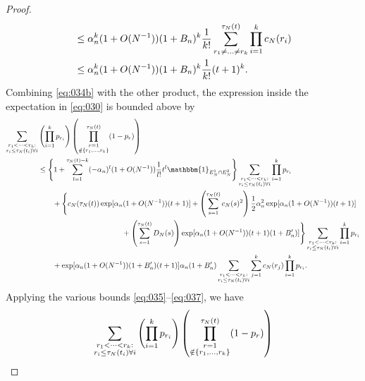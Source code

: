 \documentclass{article}
\newcommand{\1}[1]{\mathbbm{1}_{#1}}
\begin{document}
\begin{proof}
\begin{align}
&\leq \alpha_n^k (1+O(N^{-1})) (1 + B_n)^k \frac{1}{k!}
        \sum_{r_1 \neq \dots\neq r_k}^{\tau_N(t)} 
        \prod_{i=1}^k c_N(r_i) \notag\\
&\leq \alpha_n^k (1+O(N^{-1})) (1 + B_n)^k \frac{1}{k!} (t+1)^k. 
        \label{eq:037}
\end{align}
Combining \eqref{eq:034b} with the other product, the expression inside the expectation in \eqref{eq:030} is bounded above by
\begin{align}
\sum_{\substack{r_1 <\dots< r_k :\\ r_i \leq \tau_N(t_i) \forall i}}
        &\left( \prod_{i=1}^k p_{r_i} \right)
        \left( \prod_{\substack{r=1 \\ \notin \{r_1,\dots,r_k\} }}^{\tau_N(t)} 
        (1-p_r) \right) \notag\\
&\leq \Bigg\{ 1+ \sum_{l=1}^{\tau_N(t) -k} (-\alpha_n)^l (1+O(N^{-1})) 
        \frac{1}{l!} t^l \1{E_N^1 \cap E_N^2} \Bigg\}
        \sum_{\substack{r_1 <\dots< r_k :\\ r_i \leq \tau_N(t_i) \forall i}}
        \prod_{i=1}^k p_{r_i} \notag\\
    &\qquad+ \Bigg\{ c_N(\tau_N(t)) 
        \exp[ \alpha_n (1+O(N^{-1})) (t+1) ]
        + \left( \sum_{s=1}^{\tau_N(t)} c_N(s)^2 \right)
        \frac{1}{2} \alpha_n^2 \exp[ \alpha_n (1+O(N^{-1})) (t+1) ] \notag\\
    &\hspace{4cm}+ \left( \sum_{s=1}^{\tau_N(t)} D_N(s) \right)
        \exp[ \alpha_n (1+O(N^{-1})) (t+1) (1+B_n^\prime) ] \Bigg\}
        \sum_{\substack{r_1 <\dots< r_k :\\ r_i \leq \tau_N(t_i) \forall i}}
        \prod_{i=1}^k p_{r_i} \notag\\
    &\qquad+ \exp[ \alpha_n (1+O(N^{-1})) (1 + B_n^\prime) (t+1) ]
        \alpha_n (1 + B_n^\prime)
        \sum_{\substack{r_1 <\dots< r_k :\\ r_i \leq \tau_N(t_i) \forall i}}
        \sum_{j=1}^k c_N(r_j)
        \prod_{i=1}^k p_{r_i} .
\end{align}
Applying the various bounds \eqref{eq:035}--\eqref{eq:037}, we have
\begin{align}
\sum_{\substack{r_1 <\dots< r_k :\\ r_i \leq \tau_N(t_i) \forall i}}
        &\left( \prod_{i=1}^k p_{r_i} \right)
        \left( \prod_{\substack{r=1 \\ \notin \{r_1,\dots,r_k\} }}^{\tau_N(t)} 
        (1-p_r) \right) \notag\\

\end{align}
\end{proof}
\end{document}
